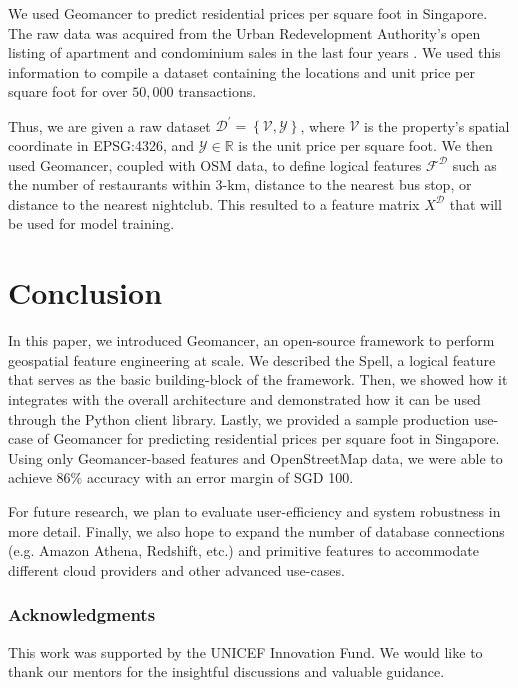 \documentclass{article}
\begin{document}

We used Geomancer to predict residential prices per square foot in Singapore. 
The raw data was acquired from the Urban Redevelopment Authority's
open listing of apartment and condominium sales in the last
four years \cite{ura2019property}. We used this information to compile a
dataset containing the locations and unit price per square foot for over $50,000$
transactions.

Thus, we are given a raw dataset $\mathcal{D}^{\prime} = \left\{\mathcal{V},
\mathcal{Y}\right\}$, where $\mathcal{V}$ is the property's spatial coordinate
in EPSG:4326, and $\mathcal{Y} \in \mathbb{R}$ is the unit price per square
foot. We then used Geomancer, coupled with OSM data, to define logical features
$\mathcal{F}^{\mathcal{D}}$ such as the number of restaurants within 3-km,
distance to the nearest bus stop, or distance to the nearest nightclub. This
resulted to a feature matrix $X^{\mathcal{D}}$ that will be used for model
training. 






\section{Conclusion}

In this paper, we introduced Geomancer, an open-source framework to perform
geospatial feature engineering at scale. We described the Spell, a logical
feature that serves as the basic building-block of the framework. Then, we
showed how it integrates with the overall architecture and demonstrated how it
can be used through the Python client library. Lastly, we provided a sample
production use-case of Geomancer for predicting residential prices per square
foot in Singapore. Using only Geomancer-based features and OpenStreetMap data,
we were able to achieve $86\%$ accuracy with an error margin of SGD 100. 

For future research, we plan to evaluate user-efficiency and system robustness
in more detail. Finally, we also hope to expand the number of database
connections (e.g. Amazon Athena, Redshift, etc.) and primitive features to
accommodate different cloud providers and other advanced use-cases.

\subsubsection*{Acknowledgments}

This work was supported by the UNICEF Innovation Fund. We would like to thank
our mentors for the insightful discussions and valuable guidance. 
 


\small

\end{document}
